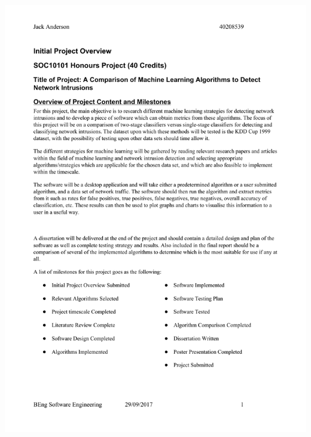 \documentclass[12pt,a4paper]{article}
\begin{document}
\begin{appendices}
\includegraphics[page=2, width=\textwidth]{figures/ipo}
\newpage

\end{appendices}
\end{document}
